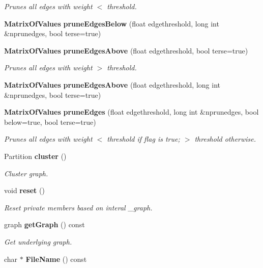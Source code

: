 \begin{CompactItemize}
\begin{CompactList}\small\item\em Prunes all edges with weight $<$ threshold. \item\end{CompactList}\item 
{\bf Matrix\-Of\-Values} {\bf prune\-Edges\-Below} (float edgethreshold, long int \&nprunedges, bool terse=true)\label{classMatrixOfValues_a5}

\item 
{\bf Matrix\-Of\-Values} {\bf prune\-Edges\-Above} (float edgethreshold, bool terse=true)\label{classMatrixOfValues_a6}

\begin{CompactList}\small\item\em Prunes all edges with weight $>$ threshold. \item\end{CompactList}\item 
{\bf Matrix\-Of\-Values} {\bf prune\-Edges\-Above} (float edgethreshold, long int \&nprunedges, bool terse=true)\label{classMatrixOfValues_a7}

\item 
{\bf Matrix\-Of\-Values} {\bf prune\-Edges} (float edgethreshold, long int \&nprunedges, bool below=true, bool terse=true)
\begin{CompactList}\small\item\em Prunes all edges with weight $<$ threshold if flag is true; $>$ threshold otherwise. \item\end{CompactList}\item 
Partition {\bf cluster} ()
\begin{CompactList}\small\item\em Cluster graph. \item\end{CompactList}\item 
void {\bf reset} ()\label{classMatrixOfValues_a10}

\begin{CompactList}\small\item\em Reset private members based on interal \_\-graph. \item\end{CompactList}\item 
graph {\bf get\-Graph} () const\label{classMatrixOfValues_a11}

\begin{CompactList}\small\item\em Get underlying graph. \item\end{CompactList}\item 
char $\ast$ {\bf File\-Name} () const\label{classMatrixOfValues_a12}


\end{CompactItemize}
